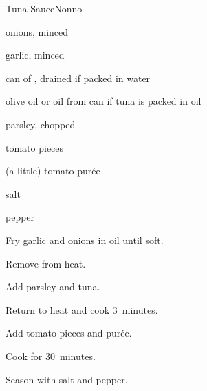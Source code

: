 \begin{recipe}{Tuna Sauce}{Nonno}{}

\begin{ingredients}
\item onions, minced
\item garlic, minced
\item can of , drained if packed in water
\item olive oil or oil from can if tuna is packed in oil
\item parsley, chopped
\item tomato pieces
\item (a little) tomato purée
\item salt
\item pepper
\end{ingredients}

\begin{directions}
\item Fry garlic and onions in oil until soft.
\item Remove from heat.
\item Add parsley and tuna.
\item Return to heat and cook 3~minutes.
\item Add tomato pieces and purée.
\item Cook for 30~minutes.
\item Season with salt and pepper.
\end{directions}

\end{recipe}
